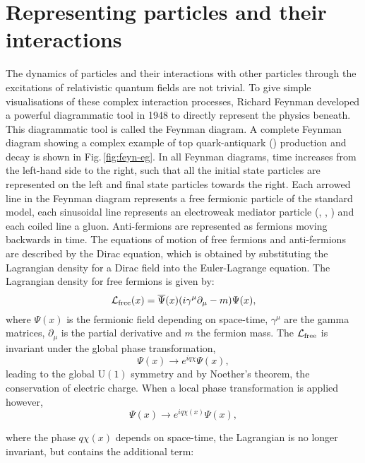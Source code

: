 \section{Representing particles and their interactions}
\label{sec:FD}

The dynamics of particles and their interactions with other particles through the excitations of relativistic quantum fields are not trivial.
To give simple visualisations of these complex interaction processes, Richard Feynman developed a powerful diagrammatic tool in 1948 to directly represent the physics beneath.
This diagrammatic tool is called the Feynman diagram.
A complete Feynman diagram showing a complex example of top quark-antiquark (\ttbar{}) production and decay is shown in Fig.\,\ref{fig:feyn-eg}.
In all Feynman diagrams, time increases from the left-hand side to the right, such that all the initial state particles are represented on the left and final state particles towards the right.
Each arrowed line in the Feynman diagram represents a free fermionic particle of the standard model, each sinusoidal line represents an electroweak mediator particle (\Wboson{}, \Zboson{}, \photon{}) and each coiled line a gluon.
Anti-fermions are represented as fermions moving backwards in time.
The equations of motion of free fermions and anti-fermions are described by the Dirac equation, which is obtained by substituting the Lagrangian density for a Dirac field into the Euler-Lagrange equation. 
The Lagrangian density for free fermions is given by:
\begin{equation}
\mathcal{L}_{\text{free}}(x) = \overline{\Psi}(x)(i\gamma^{\mu}\partial_{\mu}-m)\Psi(x),
\end{equation}
where $\Psi(x)$ is the fermionic field depending on space-time, $\gamma^{\mu}$ are the gamma matrices, $\partial_{\mu}$ is the partial derivative and $m$ the fermion mass.
The $\mathcal{L}_{\text{free}}$ is invariant under the global phase transformation,
\begin{equation}
\Psi(x) \to e^{iq\chi}\Psi(x),
\end{equation}
leading to the global $\mathrm{U(1)}$ symmetry and by Noether's theorem, the conservation of electric charge.
When a local phase transformation is applied however,
\begin{equation}
\Psi(x) \to e^{iq\chi(x)}\Psi(x),
\end{equation}

where the phase $q\chi(x)$ depends on space-time, the Lagrangian is no longer invariant, but contains the additional term:
